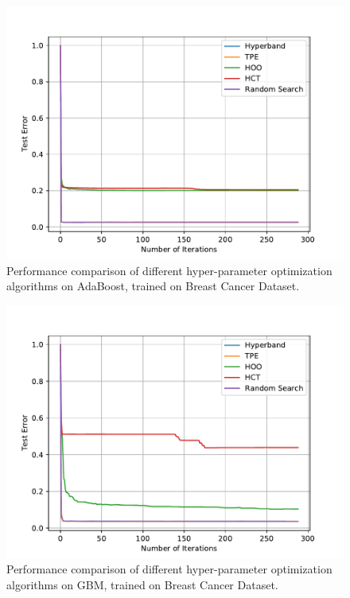 \documentclass[twoside,11pt]{article}
\begin{document}
\begin{figure}[ht]
    \centering
    \includegraphics[scale=0.8]{img/uci/ada_1.pdf}
    \caption{Performance comparison of different hyper-parameter optimization algorithms on AdaBoost, trained on Breast Cancer Dataset.}
    \label{ada_1}
\end{figure}

\begin{figure}[ht]
    \centering
    \includegraphics[scale=0.8]{img/uci/gbm_1.pdf}
    \caption{Performance comparison of different hyper-parameter optimization algorithms on GBM, trained on Breast Cancer Dataset.}
    \label{gbm_1}
\end{figure}
\end{document}
